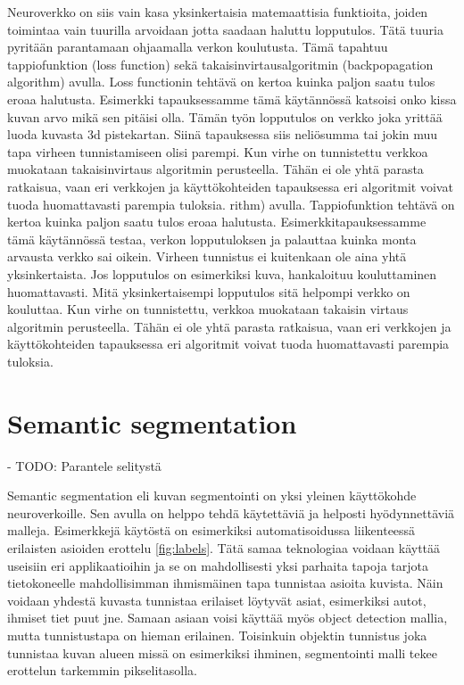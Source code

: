 Neuroverkko on siis vain kasa yksinkertaisia matemaattisia funktioita, joiden toimintaa vain tuurilla arvoidaan jotta saadaan haluttu lopputulos. Tätä tuuria pyritään parantamaan ohjaamalla verkon koulutusta. Tämä tapahtuu tappiofunktion (loss function) sekä takaisinvirtausalgoritmin (backpopagation algorithm) avulla. Loss functionin tehtävä on kertoa kuinka paljon saatu tulos eroaa halutusta. Esimerkki tapauksessamme tämä käytännössä katsoisi onko kissa kuvan arvo mikä sen pitäisi olla. Tämän työn lopputulos on verkko joka yrittää luoda kuvasta 3d pistekartan. Siinä tapauksessa siis neliösumma tai jokin muu tapa virheen tunnistamiseen olisi parempi. Kun virhe on tunnistettu verkkoa muokataan takaisinvirtaus algoritmin perusteella. Tähän ei ole yhtä parasta ratkaisua, vaan eri verkkojen ja käyttökohteiden tapauksessa eri algoritmit voivat tuoda huomattavasti parempia tuloksia.
rithm) avulla.
Tappiofunktion tehtävä on kertoa kuinka paljon saatu tulos eroaa halutusta.
Esimerkkitapauksessamme tämä käytännössä testaa, verkon lopputuloksen ja palauttaa kuinka monta arvausta verkko sai oikein.
Virheen tunnistus ei kuitenkaan ole aina yhtä yksinkertaista. 
Jos lopputulos on esimerkiksi kuva, hankaloituu kouluttaminen huomattavasti.
Mitä yksinkertaisempi lopputulos sitä helpompi verkko on kouluttaa.
Kun virhe on tunnistettu, verkkoa muokataan takaisin virtaus algoritmin perusteella.
Tähän ei ole yhtä parasta ratkaisua, vaan eri verkkojen ja käyttökohteiden tapauksessa eri algoritmit voivat tuoda huomattavasti parempia tuloksia.

\section{Semantic segmentation}

- TODO: Parantele selitystä

Semantic segmentation eli kuvan segmentointi on yksi yleinen käyttökohde neuroverkoille.
Sen avulla on helppo tehdä käytettäviä ja helposti hyödynnettäviä malleja.
Esimerkkejä käytöstä on esimerkiksi automatisoidussa liikenteessä erilaisten asioiden erottelu \ref{fig:labels}.
Tätä samaa teknologiaa voidaan käyttää useisiin eri applikaatioihin ja se on mahdollisesti yksi parhaita tapoja tarjota tietokoneelle mahdollisimman ihmismäinen tapa tunnistaa asioita kuvista. Näin voidaan yhdestä kuvasta tunnistaa erilaiset löytyvät asiat, esimerkiksi autot, ihmiset tiet puut jne. Samaan asiaan voisi käyttää myös object detection mallia, mutta tunnistustapa on hieman erilainen. Toisinkuin objektin tunnistus joka tunnistaa kuvan alueen missä on esimerkiksi ihminen, segmentointi malli tekee erottelun tarkemmin pikselitasolla.

